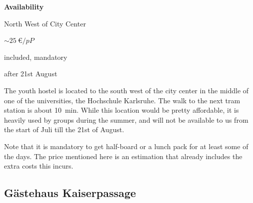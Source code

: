 \begin{labeling}{\bf Availability}
  \item[\bf Location] North West of City Center
  \item[\bf Price] $\sim\SI{25}{\euro/{pP}}$
  \item[\bf Breakfast] included, mandatory
  \item[\bf Availability] after 21st August
\end{labeling}

The youth hostel is located to the south west of the city center in the middle
of one of the universities, the Hochschule Karlsruhe. The walk to the
next tram station is about \SI{10}{\minute}. While this location would be
pretty affordable, it is heavily used by groups during the summer, and will
not be available to us from the start of Juli till the 21st of August.

Note that it is mandatory to get half-board or a lunch pack for at least some
of the days. The price mentioned here is an estimation that already includes
the extra costs this incurs.

\subsection{Gästehaus Kaiserpassage}

